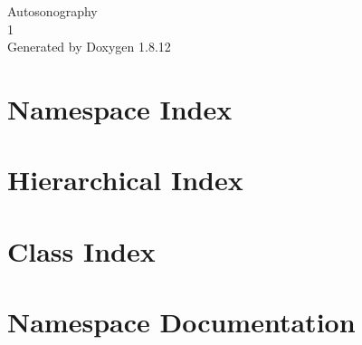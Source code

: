 \documentclass[twoside]{book}
\newcommand{\+}{\discretionary{\mbox{\scriptsize$\hookleftarrow$}}{}{}}
\newcommand{\clearemptydoublepage}{%
  \newpage{\pagestyle{empty}\cleardoublepage}%
}
\begin{document}
\hypersetup{pageanchor=false,
             bookmarksnumbered=true,
             pdfencoding=unicode
            }
\begin{titlepage}
\vspace*{7cm}
\begin{center}%
{\Large Autosonography \\[1ex]\large 1 }\\
\vspace*{1cm}
{\large Generated by Doxygen 1.8.12}\\
\end{center}
\end{titlepage}
\clearemptydoublepage
{}
\tableofcontents
\clearemptydoublepage
{}
\hypersetup{pageanchor=true}

\chapter{Namespace Index}

\chapter{Hierarchical Index}

\chapter{Class Index}

\chapter{Namespace Documentation}









\end{document}
